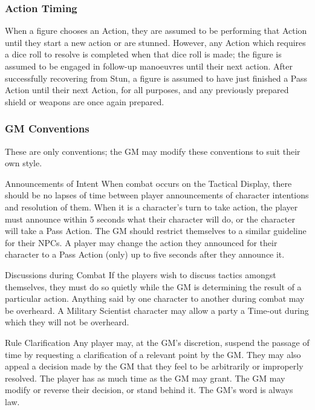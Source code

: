 \begin{multicols*}{3}
\begin{Description}
\end{Description}

\subsubsection{Action Timing}

When a figure chooses an Action, they are assumed to be performing
that Action until they start a new action or are stunned. However, any
Action which requires a dice roll to resolve is completed when that
dice roll is made; the figure is assumed to be engaged in follow-up
manoeuvres until their next action.  After successfully recovering
from Stun, a figure is assumed to have just finished a Pass Action
until their next Action, for all purposes, and any previously prepared
shield or weapons are once again prepared.

\subsubsection{GM Conventions}

These are only conventions; the GM may modify these conventions to
suit their own style.
\begin{Description}
\item[Announcements of Intent] When combat occurs on the Tactical
Display, there should be no lapses of time between player
announcements of character intentions and resolution of them. When it
is a character's turn to take action, the player must announce within
5 seconds what their character will do, or the character will take a
Pass Action. The GM should restrict themselves to a similar guideline
for their NPCs. A player may change the action they announced for
their character to a Pass Action (only) up to five seconds after they
announce it.

\item[Discussions during Combat] If the players wish to discuss
tactics amongst themselves, they must do so quietly while the GM is
determining the result of a particular action. Anything said by one
character to another during combat may be overheard. A Military
Scientist character may allow a party a Time-out during which they
will not be overheard.

\item[Rule Clarification] Any player may, at the GM's discretion,
suspend the passage of time by requesting a clarification of a
relevant point by the GM. They may also appeal a decision made by the
GM that they feel to be arbitrarily or improperly resolved. The player
has as much time as the GM may grant. The GM may modify or reverse
their decision, or stand behind it. The GM's word is always law.
\end{Description}


\end{multicols*}
